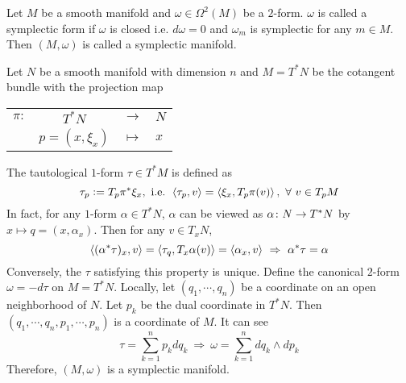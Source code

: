 \documentclass[a4paper,12pt]{article}
\begin{document}
	\begin{defn}
		Let $M$ be a smooth manifold and $\omega \in \Omega^2(M)$ be a $2$-form. $\omega$ is called a symplectic form if $\omega$ is closed i.e. $d\omega = 0$ and $\omega_m$ is symplectic for any $m \in M$. Then $(M,\omega)$ is called a symplectic manifold.
	\end{defn}

	\begin{exam}
		Let $N$  be a smooth manifold with dimension $n$ and $M = T^*N$ be the cotangent bundle with the projection map
		\begin{center}
			\begin{tabular}{l c c l}
				$\pi \colon$ & $T^*N$ & $\longrightarrow$ & $N$ \\
				~ & $p=(x,\xi_x)$ & $\longmapsto$ & $x$
			\end{tabular}
		\end{center}
		The tautological $1$-form $\tau \in T^*M$ is defined as
		\begin{equation*}
			\tau_p \vcentcolon= T_p\pi^*\xi_x, \text{ i.e. } \left\langle \tau_p,v \right\rangle = \left\langle \xi_x,T_p\pi (v) \right\rangle,~\forall~v \in T_pM
		\end{equation*}
		In fact, for any $1$-form $\alpha \in T^*N$, $\alpha$ can be viewed as $\alpha \colon N \rightarrow T^*N$ by $x \mapsto q=(x,\alpha_x)$. Then for any $v \in T_xN$,
		\begin{equation*}
			\left\langle (\alpha^*\tau)_x,v \right\rangle = \left\langle \tau_q, T_x\alpha(v) \right\rangle = \left\langle \alpha_x,v \right\rangle~\Rightarrow~ \alpha^*\tau = \alpha
		\end{equation*}
		Conversely, the $\tau$ satisfying this property is unique. Define the canonical $2$-form $\omega = -d\tau$ on $M  = T^*N$. Locally, let $(q_1,\cdots,q_n)$ be a coordinate on an open neighborhood of $N$. Let $p_k$ be the dual coordinate in $T^*N$. Then $(q_1,\cdots,q_n,p_1,\cdots,p_n)$ is a coordinate of $M$. It can see
		\begin{equation*}
			\tau = \sum_{k=1}^n p_k dq_k ~\Rightarrow~ \omega = \sum_{k=1}^n dq_k \wedge dp_k
		\end{equation*}
		Therefore, $(M,\omega)$ is a symplectic manifold.
	\end{exam}
\end{document}
